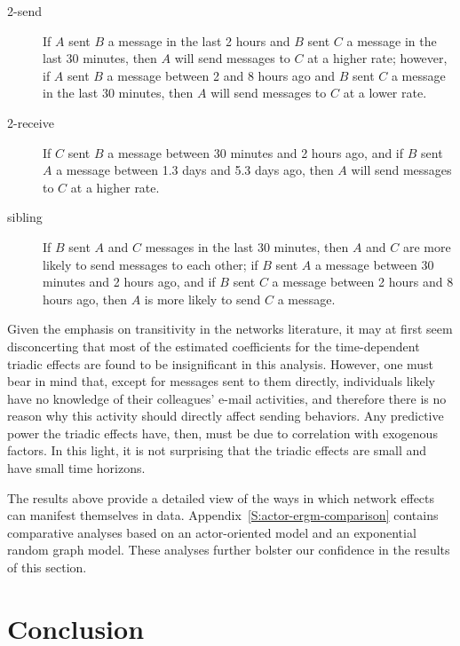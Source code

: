 \documentclass[final]{statsoc}
\begin{document}
\begin{description}

\item[2-send] If $A$ sent $B$ a message in the last 2 hours and $B$ sent $C$ a message in the last 30 minutes, then $A$ will send messages to $C$ at a higher rate; however, if $A$ sent $B$ a message between 2 and 8 hours ago and $B$ sent $C$ a message in the last 30 minutes, then $A$ will send messages to $C$ at a lower rate.

\item[2-receive] If $C$ sent $B$ a message between 30 minutes and 2 hours ago, and if $B$ sent $A$ a message between 1.3 days and 5.3 days ago, then $A$ will send messages to $C$ at a higher rate.

\item[sibling] If $B$ sent $A$ and $C$ messages in the last 30 minutes, then $A$ and $C$ are more likely to send messages to each other; if $B$ sent $A$ a message between 30 minutes and 2 hours ago, and if $B$ sent $C$ a message between 2 hours and 8 hours ago, then $A$ is more likely to send $C$ a message.

\end{description}

Given the emphasis on transitivity in the networks literature, it may at first seem disconcerting that most of the estimated coefficients for the time-dependent triadic effects are found to be insignificant in this analysis.  However, one must bear in mind that, except for  messages sent to them directly, individuals likely have no knowledge of their colleagues' e-mail activities, and therefore there is no reason why this activity should directly affect sending behaviors.  Any predictive power the triadic effects have, then, must be due to correlation with
exogenous factors.  In this light, it is not surprising that the triadic effects are small and have small time horizons.

The results above provide a detailed view of the
ways in which network effects can manifest themselves in data.
Appendix~\ref{S:actor-ergm-comparison} contains comparative analyses based on
an actor-oriented model and an exponential random graph model.  These analyses
further bolster our confidence in the results of this section.

\FloatBarrier

\section{Conclusion}\label{S:discussion}
\end{document}
